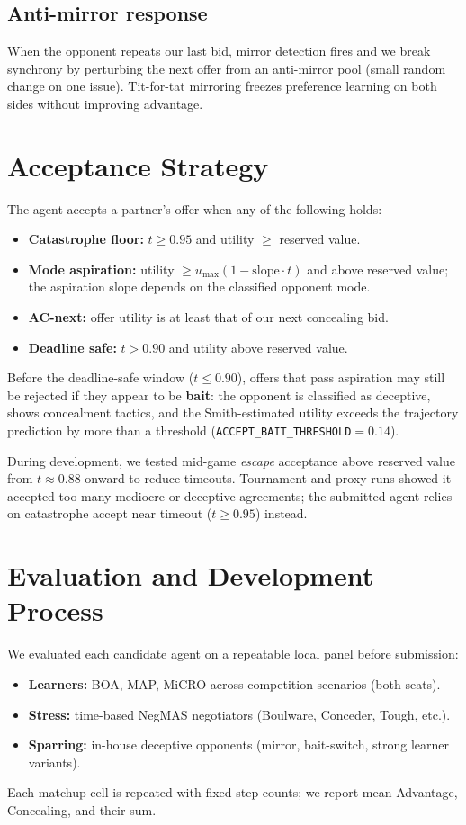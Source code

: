 \documentclass[11pt]{article}
\begin{document}
\subsection{Anti-mirror response}

When the opponent repeats our last bid, mirror detection fires and we break synchrony by
perturbing the next offer from an anti-mirror pool (small random change on one issue).
Tit-for-tat mirroring freezes preference learning on both sides without improving advantage.

\section{Acceptance Strategy}

The agent accepts a partner's offer when any of the following holds:
\begin{itemize}
  \item \textbf{Catastrophe floor:} $t \ge 0.95$ and utility $\ge$ reserved value.
  \item \textbf{Mode aspiration:} utility $\ge u_{\max}(1 - \text{slope} \cdot t)$ and above
        reserved value; the aspiration slope depends on the classified opponent mode.
  \item \textbf{AC-next:} offer utility is at least that of our next concealing bid.
  \item \textbf{Deadline safe:} $t > 0.90$ and utility above reserved value.
\end{itemize}

Before the deadline-safe window ($t \le 0.90$), offers that pass aspiration may still be
rejected if they appear to be \textbf{bait}: the opponent is classified as deceptive, shows
concealment tactics, and the Smith-estimated utility exceeds the trajectory prediction by more
than a threshold (\texttt{ACCEPT\_BAIT\_THRESHOLD}${}=0.14$).

During development, we tested mid-game \emph{escape} acceptance above reserved value from
$t \approx 0.88$ onward to reduce timeouts.
Tournament and proxy runs showed it accepted too many mediocre or deceptive agreements; the
submitted agent relies on catastrophe accept near timeout ($t \ge 0.95$) instead.

\section{Evaluation and Development Process}

We evaluated each candidate agent on a repeatable local panel before submission:
\begin{itemize}
  \item \textbf{Learners:} BOA, MAP, MiCRO across competition scenarios (both seats).
  \item \textbf{Stress:} time-based NegMAS negotiators (Boulware, Conceder, Tough, etc.).
  \item \textbf{Sparring:} in-house deceptive opponents (mirror, bait-switch, strong learner
        variants).
\end{itemize}
Each matchup cell is repeated with fixed step counts; we report mean Advantage, Concealing, and
their sum.
\end{document}
